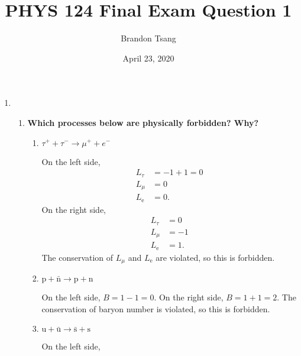\documentclass[11pt]{article}
\title{PHYS 124 Final Exam Question 1}
\author{Brandon Tsang}
\date{April 23, 2020}
\begin{document}
    \maketitle
    \begin{enumerate}[label=\textbf{\arabic*.}]
        \item{
            \begin{enumerate}[label=\textbf{(\alph*)}]
                \item{
                    \textbf{Which processes below are physically forbidden? Why?}
                    \begin{enumerate}[label=\textbf{(\roman*)}]
                        \item{
                            \textbf{\boldmath \(\tau^++\tau^-\rightarrow\mu^++e^-\)}
                            \par
                            On the left side,
                            \begin{align*}
                                L_\tau&=-1+1=0 \\
                                L_\mu&=0 \\
                                L_\mathrm{e}&=0.
                            \end{align*}
                            On the right side,
                            \begin{align*}
                                L_\tau&=0 \\
                                L_\mu&=-1 \\
                                L_\mathrm{e}&=1.
                            \end{align*}
                            The conservation of \(L_\mu\) and \(L_\mathrm{e}\) are violated, so this is forbidden.
                        }
                        \item{
                            \textbf{\boldmath \(\mathrm{p}+\bar{\mathrm{n}}\rightarrow\mathrm{p}+\mathrm{n}\)}
                            \par
                            On the left side, \(B=1-1=0\). On the right side, \(B=1+1=2\). The conservation of baryon number is violated, so this is forbidden.
                        }
                        \item{
                            \textbf{\boldmath \(\mathrm{u}+\bar{\mathrm{u}}\rightarrow\bar{\mathrm{s}}+\mathrm{s}\)}
                            \par
                            On the left side,
}
\end{enumerate}}
\end{enumerate}}
\end{enumerate}
\end{document}
